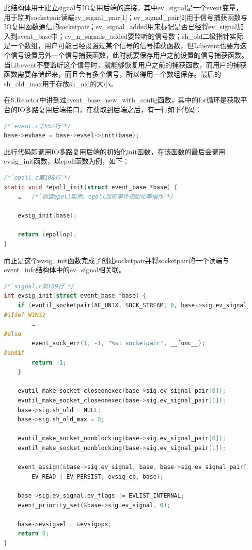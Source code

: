 \documentclass[11pt,a4paper]{article}
\begin{document}
此结构体用于建立signal与IO复用后端的连接。其中ev\_signal是一个event变量，用于监听socketpair读端ev\_signal\_pair[1]；ev\_signal\_pair[2]用于信号捕获函数与IO复用函数通信的socketpair；ev\_signal\_added用来标记是否已经将ev\_signal加入到event\_base中；ev\_n\_signals\_added要监听的信号数；sh\_old二级指针实际是一个数组，用户可能已经设置过某个信号的信号捕获函数，但Libevent也要为这个信号设置另外一个信号捕获函数，此时就要保存用户之前设置的信号捕获函数。当Libevent不要监听这个信号时，就能够恢复用户之前的捕获函数，而用户的捕获函数需要存储起来，而且会有多个信号，所以得用一个数组保存。最后的sh\_old\_max用于存放sh\_old的大小。

在S.Reactor中讲到过event\_base\_new\_with\_config函数，其中的for循环是获取平台的IO多路复用后端接口，在获取到后端之后，有一行如下代码：
\begin{lstlisting}[language=C]
/*`event.c第552行`*/
base->evbase = base->evsel->init(base);
\end{lstlisting}

此行代码即调用IO多路复用后端的初始化init函数，在该函数的最后会调用evsig\_init函数，以epoll函数为例，如下：
\begin{lstlisting}[language=C]
/*`epoll.c第108行`*/
static void *epoll_init(struct event_base *base) {
	…	/*`创建epoll实例、epoll监听事件初始化等操作`*/
	
	evsig_init(base);

	return (epollop);
}
\end{lstlisting}
而正是这个evsig\_init函数完成了创建socketpair并将socketpair的一个读端与event\_info结构体中的ev\_signal相关联。

\begin{lstlisting}[language=C]
/*`signal.c第169行`*/
int evsig_init(struct event_base *base) {
	if (evutil_socketpair(AF_UNIX, SOCK_STREAM, 0, base->sig.ev_signal_pair) == -1) {
#ifdef WIN32	
		…
#else
		event_sock_err(1, -1, "%s: socketpair", __func__);
#endif
		return -1;
	}

	evutil_make_socket_closeonexec(base->sig.ev_signal_pair[0]);
	evutil_make_socket_closeonexec(base->sig.ev_signal_pair[1]);
	base->sig.sh_old = NULL;
	base->sig.sh_old_max = 0;

	evutil_make_socket_nonblocking(base->sig.ev_signal_pair[0]);
	evutil_make_socket_nonblocking(base->sig.ev_signal_pair[1]);

	event_assign(&base->sig.ev_signal, base, base->sig.ev_signal_pair[1],
		EV_READ | EV_PERSIST, evsig_cb, base);

	base->sig.ev_signal.ev_flags |= EVLIST_INTERNAL;
	event_priority_set(&base->sig.ev_signal, 0);

	base->evsigsel = &evsigops;
	return 0;
}
\end{lstlisting}
\end{document}
